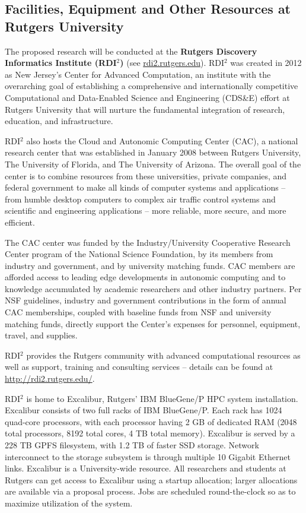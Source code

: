 
\begin{center}
\section*{Facilities, Equipment and Other Resources at Rutgers University}
\end{center}

\noindent The proposed research will be conducted at the {\bf Rutgers Discovery Informatics Institute  (RDI$^2$)} (see \url{rdi2.rutgers.edu}). RDI$^2$ was created in 2012 as New Jersey's Center for Advanced Computation, an institute with the overarching goal of establishing a comprehensive and internationally competitive Computational and Data-Enabled Science and Engineering (CDS\&E) effort at Rutgers University that will nurture the fundamental integration of research, education, and infrastructure. 

RDI$^2$ also hosts the Cloud and Autonomic Computing Center (CAC), a national research center that was established in January 2008 between Rutgers University, The University of Florida, and The University of Arizona.  The overall goal of the center is to combine resources from these universities, private companies, and federal government to make all kinds of computer systems and applications -- from humble desktop computers to complex air traffic control systems and scientific and engineering applications -- more reliable, more secure, and more efficient. 

The CAC center was funded by the Industry/University Cooperative Research Center program of the National Science Foundation, by its members from industry and government, and by university matching funds. CAC members are afforded access to leading edge developments in autonomic computing and to knowledge accumulated by academic researchers and other industry partners. Per NSF guidelines, industry and government contributions in the form of annual CAC memberships, coupled with baseline funds from NSF and university matching funds, directly support the Center's expenses for personnel, equipment, travel, and supplies. 

RDI$^2$ provides the Rutgers community with advanced computational resources as well as support, training and consulting services -- details can be found at \url{http://rdi2.rutgers.edu/}.

RDI$^2$ is home to Excalibur, Rutgers' IBM BlueGene/P HPC system installation.  Excalibur consists of two full racks of IBM BlueGene/P.  Each rack has 1024 quad-core processors, with each processor having 2 GB of dedicated RAM (2048 total processors, 8192 total cores, 4 TB total memory).  Excalibur is served by a 228 TB GPFS filesystem, with 1.2 TB of faster SSD storage.  Network interconnect to the storage subsystem is through multiple 10 Gigabit Ethernet links.  Excalibur is a University-wide resource.  All researchers and students at Rutgers can get access to Excalibur using a startup allocation; larger allocations are available via a proposal process. Jobs are scheduled round-the-clock so as to maximize utilization of the system.  

